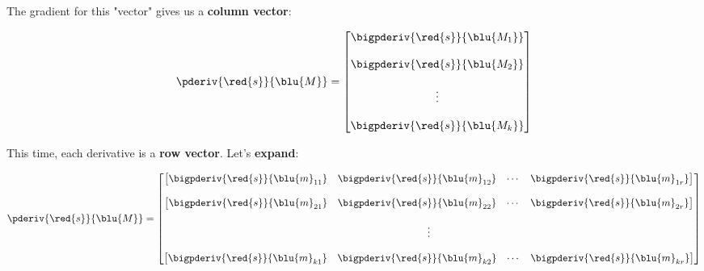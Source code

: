         The gradient for this "vector" gives us a \textbf{column vector}:
        
        \begin{equation}
            \pderiv{ \red{s} }{ \blu{M} }  
            =
            \begin{bmatrix}
                \bigpderiv{ \red{s} }{ \blu{M_1} } \\
                \\
                \bigpderiv{ \red{s} }{ \blu{M_2} } \\
                \\
                \vdots \\
                \\
                \bigpderiv{ \red{s} }{ \blu{M_k} }
            \end{bmatrix}
        \end{equation}
        
        This time, each derivative is a \textbf{row vector}. Let's \textbf{expand}:
        
        \begin{equation}
            \pderiv{ \red{s} }{ \blu{M} }  
            =
            \begin{bmatrix}
                \begin{bmatrix}
                    \bigpderiv{ \red{s} }{ \blu{m}_{11} }    
                    & 
                    \bigpderiv{ \red{s} }{ \blu{m}_{12} } 
                    & 
                    \cdots 
                    & 
                    \bigpderiv{ \red{s} }{ \blu{m}_{1r} } 
                \end{bmatrix}
                \\\\
                \begin{bmatrix}
                    \bigpderiv{ \red{s} }{ \blu{m}_{21} }    
                    & 
                    \bigpderiv{ \red{s} }{ \blu{m}_{22} } 
                    & 
                    \cdots 
                    & 
                    \bigpderiv{ \red{s} }{ \blu{m}_{2r} } 
                \end{bmatrix}
                \\\\
                \vdots
                \\\\
                \begin{bmatrix}
                    \bigpderiv{ \red{s} }{ \blu{m}_{k1} }    
                    & 
                    \bigpderiv{ \red{s} }{ \blu{m}_{k2} } 
                    & 
                    \cdots 
                    & 
                    \bigpderiv{ \red{s} }{ \blu{m}_{kr} } 
                \end{bmatrix}
            \end{bmatrix}
        \end{equation}
        
